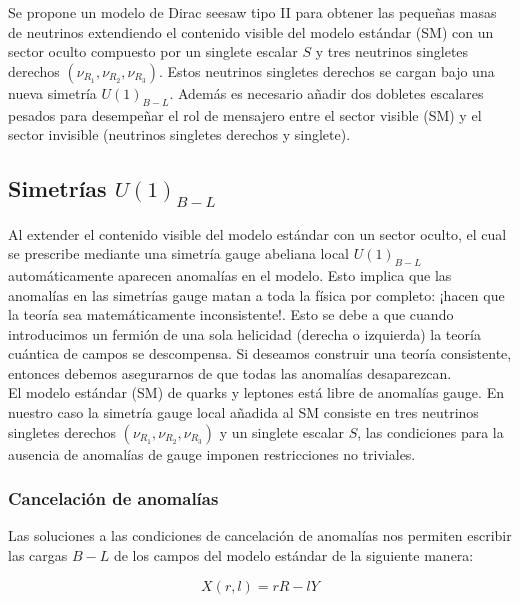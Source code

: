 \documentclass[12pt]{article}
\begin{document}
Se propone un modelo de Dirac seesaw tipo II para obtener las pequeñas masas de neutrinos extendiendo el contenido visible del modelo estándar (SM) con un sector oculto compuesto por un singlete escalar $S$ y tres  neutrinos singletes derechos $(\nu_{R_1},\nu_{R_2}, \nu_{R_3} )$. Estos neutrinos singletes derechos se cargan bajo una nueva simetría $U(1)_{B-L}$. Además es necesario añadir dos dobletes escalares pesados para desempeñar el rol de mensajero entre el sector visible (SM) y el sector invisible (neutrinos singletes derechos y singlete). 





\subsection{Simetrías $U(1)_{B-L}$ } 

Al extender el contenido visible del modelo estándar con un sector oculto, el cual se prescribe mediante una simetría gauge abeliana local $U(1)_{B-L}$ automáticamente aparecen anomalías en el modelo. Esto implica que las anomalías en las simetrías gauge matan a toda la física por completo: ¡hacen que la teoría sea matemáticamente inconsistente!. Esto se debe a que cuando introducimos un fermión de una sola helicidad (derecha o izquierda) la teoría cuántica de campos se descompensa. Si deseamos construir una teoría consistente, entonces debemos asegurarnos de que todas las anomalías desaparezcan. \\ 


El modelo estándar (SM) de quarks y leptones está libre de anomalías gauge. En nuestro  caso la simetría gauge local añadida al SM consiste en tres  neutrinos singletes derechos $(\nu_{R_1},\nu_{R_2}, \nu_{R_3} )$ y un singlete escalar $S$, las condiciones para la ausencia de anomalías de gauge imponen restricciones no triviales. \\ 




\subsubsection{Cancelación de anomalías}

Las soluciones a las condiciones de cancelación de anomalías nos permiten escribir las cargas $B-L$ de los campos del modelo estándar de la siguiente manera:  

\begin{equation}
 X (r,l)=rR-lY   
\end{equation} \\
\end{document}

